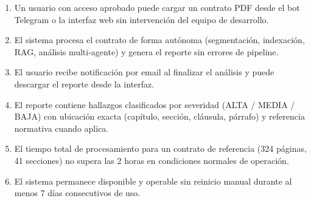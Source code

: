 \begin{enumerate}
    \item Un usuario con acceso aprobado puede cargar un contrato PDF
    desde el bot Telegram o la interfaz web sin intervención del equipo
    de desarrollo.
    \item El sistema procesa el contrato de forma autónoma (segmentación,
    indexación, RAG, análisis multi-agente) y genera el reporte sin
    errores de pipeline.
    \item El usuario recibe notificación por email al finalizar el
    análisis y puede descargar el reporte desde la interfaz.
    \item El reporte contiene hallazgos clasificados por severidad
    (ALTA / MEDIA / BAJA) con ubicación exacta (capítulo, sección,
    cláusula, párrafo) y referencia normativa cuando aplica.
    \item El tiempo total de procesamiento para un contrato de referencia
    (324 páginas, 41 secciones) no supera las 2 horas en condiciones
    normales de operación.
    \item El sistema permanece disponible y operable sin reinicio manual
    durante al menos 7 días consecutivos de uso.
\end{enumerate}